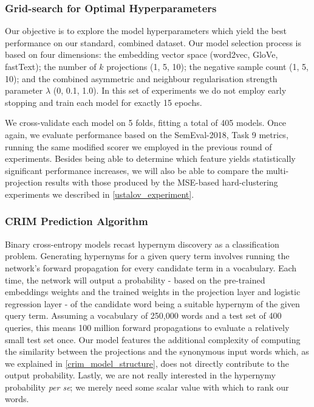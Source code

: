 \subsubsection{Grid-search for Optimal Hyperparameters}
Our objective is to explore the model hyperparameters which yield the best performance on our standard, combined dataset.  Our model selection process is based on four dimensions: the embedding vector space (word2vec, GloVe, fastText); the number of $k$ projections (1, 5, 10); the negative sample count (1, 5, 10); and the combined asymmetric and neighbour regularisation strength parameter $\lambda$ (0, 0.1, 1.0).  In this set of experiments we do not employ early stopping and train each model for exactly 15 epochs.  

We cross-validate each model on 5 folds, fitting a total of 405 models.  Once again, we evaluate performance based on the SemEval-2018, Task 9 metrics, running the same modified scorer we employed in the previous round of experiments.  Besides being able to determine which feature yields statistically significant performance increases, we will also be able to compare the multi-projection results with those produced by the \ac{MSE}-based hard-clustering experiments we described in \cref{ustalov_experiment}.  

\subsubsection{CRIM Prediction Algorithm} \label{crim_prediction}
Binary cross-entropy models recast hypernym discovery as a classification problem.  Generating hypernyms for a given query term involves running the network's forward propagation for every candidate term in a vocabulary.  Each time, the network will output a probability - based on the pre-trained embeddings weights and the trained weights in the projection layer and logistic regression layer - of the candidate word being a suitable hypernym of the given query term.  Assuming a vocabulary of 250,000 words and a test set of 400 queries, this means 100 million forward propagations to evaluate a relatively small test set once.  Our model features the additional complexity of computing the similarity between the projections and the synonymous input words which, as we explained in \cref{crim_model_structure}, does not directly contribute to the output probability.  Lastly, we are not really interested in the hypernymy probability \textit{per se}; we merely need some scalar value with which to rank our words.

